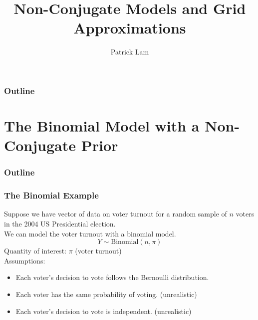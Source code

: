 \documentclass{beamer}
\author{Patrick Lam}
\title{Non-Conjugate Models and Grid Approximations}
\date{}
\begin{document}
\newcommand{\red}{\textcolor{red}}
\newcommand{\blue}{\textcolor{blue}}
\newcommand{\purple}{\textcolor{purple}}

\frame{\titlepage}

\begin{frame}
\frametitle{Outline}
\tableofcontents
\end{frame}

\section{The Binomial Model with a Non-Conjugate Prior}

\begin{frame}
\frametitle{Outline}
\tableofcontents[currentsection]
\end{frame}

\begin{frame}
\frametitle{The Binomial Example}
\pause
Suppose we have vector of data on voter turnout for a random sample of $n$
voters in the 2004 US Presidential election.   \\
\pause
\bigskip
We can model the voter turnout with a binomial model.\\
\pause
\begin{equation*}
Y \sim \mathrm{Binomial}(n, \pi)
\end{equation*}
\pause
\bigskip
Quantity of interest: $\pi$ (voter turnout)\\
\pause
\bigskip
Assumptions:
\pause
\begin{itemize}
\item Each voter's decision to vote follows the Bernoulli
distribution. \pause
\item Each voter has the same probability of voting.  \pause
(unrealistic) \pause
\item Each voter's decision to vote is independent.  \pause (unrealistic)
\end{itemize}
\end{frame}
\end{document}
